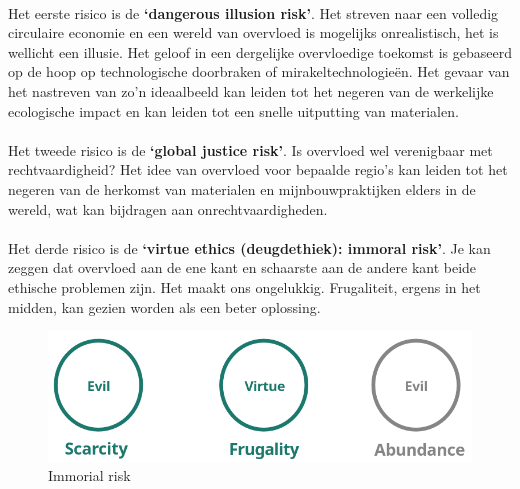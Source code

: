 \documentclass[../summary.tex]{subfiles}
\begin{document}
	\newpage
	\ \\
	Het  eerste risico is de \textbf{`dangerous illusion risk'}. Het streven naar een volledig circulaire economie en een wereld van overvloed is mogelijks onrealistisch, het is wellicht een illusie. Het geloof in een dergelijke overvloedige toekomst is gebaseerd op de hoop op technologische doorbraken of mirakeltechnologieën. Het gevaar van het nastreven van zo'n ideaalbeeld kan leiden tot het negeren van de werkelijke ecologische impact en kan leiden tot een snelle uitputting van materialen.\\
	\\
	Het tweede risico is de \textbf{`global justice risk'}.  Is overvloed wel verenigbaar met rechtvaardigheid? Het idee van overvloed voor bepaalde regio's kan leiden tot het negeren van de herkomst van materialen en mijnbouwpraktijken elders in de wereld, wat kan bijdragen aan onrechtvaardigheden.\\
	\\
	Het derde risico is de \textbf{`virtue ethics (deugdethiek): immoral risk'}. Je kan zeggen dat overvloed aan de ene kant en schaarste aan de andere kant beide ethische problemen zijn. Het maakt ons ongelukkig. Frugaliteit, ergens in het midden, kan gezien worden als een beter oplossing.
	
	\begin{figure}[H]
		\centering
		\includegraphics[width=0.6\linewidth]{../images/immorial-risk}
		\caption{Immorial risk}
		\label{fig:immorial-risk}
	\end{figure}
	
\end{document}
